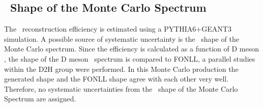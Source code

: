 \subsection{\pt\ Shape of the Monte Carlo Spectrum}
The \Dstar\ reconstruction efficiency is estimated using a PYTHIA6+GEANT3 simulation.
A possible source of systematic uncertainty is the \ptd\ shape of the Monte Carlo spectrum.
Since the efficiency is calculated as a function of D meson , the shape of the D meson \ptd\ spectrum is compared to FONLL, a parallel studies within the D2H group were performed. In this Monte Carlo production the generated shape and the FONLL shape agree with each other very well. Therefore, no systematic uncertainties from the \ptd\ shape of the Monte Carlo Spectrum are assigned.


